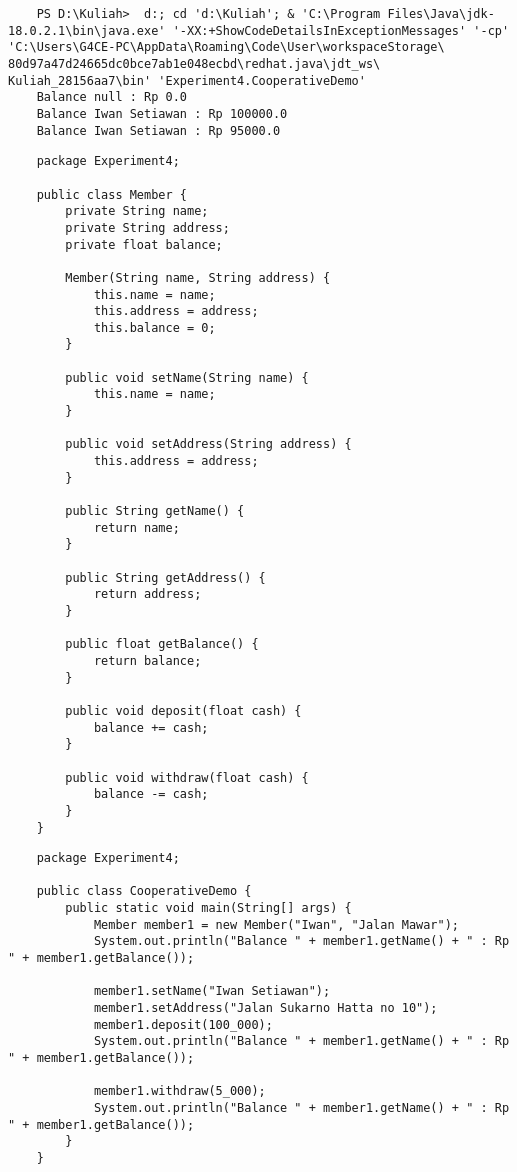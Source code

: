 \documentclass[12pt,titlepage]{article}
\begin{document}
\begin{verbatim}
    PS D:\Kuliah>  d:; cd 'd:\Kuliah'; & 'C:\Program Files\Java\jdk-18.0.2.1\bin\java.exe' '-XX:+ShowCodeDetailsInExceptionMessages' '-cp' 'C:\Users\G4CE-PC\AppData\Roaming\Code\User\workspaceStorage\ 80d97a47d24665dc0bce7ab1e048ecbd\redhat.java\jdt_ws\ Kuliah_28156aa7\bin' 'Experiment4.CooperativeDemo' 
    Balance null : Rp 0.0
    Balance Iwan Setiawan : Rp 100000.0
    Balance Iwan Setiawan : Rp 95000.0
\end{verbatim}

\begin{verbatim}
    package Experiment4;

    public class Member {
        private String name;
        private String address;
        private float balance;

        Member(String name, String address) {
            this.name = name;
            this.address = address;
            this.balance = 0;
        }

        public void setName(String name) {
            this.name = name;
        }

        public void setAddress(String address) {
            this.address = address;
        }

        public String getName() {
            return name;
        }

        public String getAddress() {
            return address;
        }

        public float getBalance() {
            return balance;
        }

        public void deposit(float cash) {
            balance += cash;
        }

        public void withdraw(float cash) {
            balance -= cash;
        }
    }

\end{verbatim}

\begin{verbatim}
    package Experiment4;

    public class CooperativeDemo {
        public static void main(String[] args) {
            Member member1 = new Member("Iwan", "Jalan Mawar");
            System.out.println("Balance " + member1.getName() + " : Rp " + member1.getBalance());

            member1.setName("Iwan Setiawan");
            member1.setAddress("Jalan Sukarno Hatta no 10");
            member1.deposit(100_000);
            System.out.println("Balance " + member1.getName() + " : Rp " + member1.getBalance());
            
            member1.withdraw(5_000);
            System.out.println("Balance " + member1.getName() + " : Rp " + member1.getBalance());
        }
    }

\end{verbatim}
\end{document}
